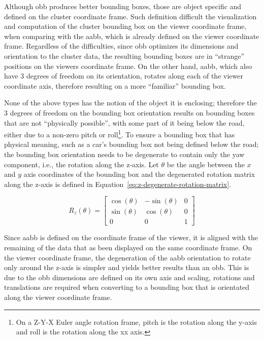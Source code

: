 Although \ac{obb} produces better bounding boxes, those are object specific and defined on the cluster coordinate frame. Such definition difficult the visualization and computation of the cluster bounding box on the viewer coordinate frame, when comparing with the \ac{aabb}, which is already defined on the viewer coordinate frame. Regardless of the difficulties, since \ac{obb} optimizes its dimensions and orientation to the cluster data, the resulting bounding boxes are in ``strange'' positions on the viewers coordinate frame. On the other hand, \ac{aabb}, which also have 3 degrees of freedom on its orientation, rotates along each of the viewer coordinate axis, therefore resulting on a more ``familiar'' bounding box.

None of the above types has the notion of the object it is enclosing; therefore the 3 degrees of freedom  on the bounding box orientation results on bounding boxes that are not ``physically possible'', with some part of it being below the road, either due to a non-zero pitch or roll\footnote{On a Z-Y-X Euler angle rotation frame, pitch is the rotation along the y-axis and roll is the rotation along the xx axis.}. To ensure a bounding box that has physical meaning, such as a car's bounding box not being defined below the road; the bounding box orientation needs to be degenerate to contain only the yaw component, i.e., the rotation along the z-axis. Let $\theta$ be the angle between the $x$ and $y$ axis coordinates of the bounding box and the degenerated rotation matrix along the z-axis is defined in Equation~\eqref{eq:z-degenerate-rotation-matrix}.

\begin{equation}
	\label{eq:z-degenerate-rotation-matrix}
	R_z(\theta) = 
	\begin{bmatrix}
		\cos(\theta) & -\sin(\theta) & 0 \\
		\sin(\theta) & \cos(\theta) & 0 \\
		0 & 0 & 1
	\end{bmatrix}
\end{equation}

Since \ac{aabb} is defined on the coordinate frame of the viewer, it is aligned with the remaining of the data that as been displayed on the same coordinate frame. On the viewer coordinate frame, the degeneration of the \ac{aabb} orientation to rotate only around the z-axis is simpler and yields better results than an \ac{obb}. This is due to the \ac{obb} dimensions are defined on its own axis and scaling, rotations and translations are required when converting to a bounding box that is orientated along the viewer coordinate frame. 

